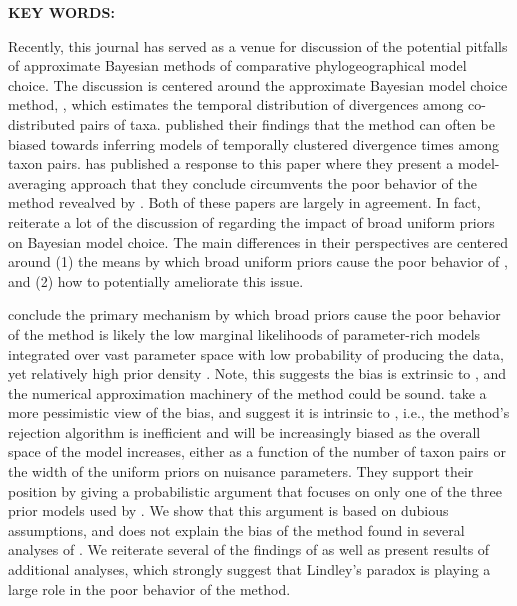 \documentclass[letterpaper,12pt]{article}
\begin{document}
\begin{linenumbers}
{    \vspace{12pt}
    \noindent\textbf{KEY WORDS: } 
}

\newpage
\noindent Recently, this journal has served as a venue for discussion of the
potential pitfalls of approximate Bayesian methods of comparative
phylogeographical model choice.
The discussion is centered around the approximate Bayesian model choice method,
\msb, which estimates the temporal distribution of divergences among
co-distributed pairs of taxa.
\citet{Oaks2012} published their findings that the method \msb can often be
biased towards inferring models of temporally clustered divergence times
among taxon pairs.
\citet{Hickerson2013} has published a response to this paper where they
present a model-averaging approach that they conclude circumvents the poor
behavior of the method revealved by \citet{Oaks2012}.
Both of these papers are largely in agreement.
In fact, \citet{Hickerson2013} reiterate a lot of the discussion of
\citet{Oaks2012} regarding the impact of broad uniform priors on Bayesian model
choice.
The main differences in their perspectives are centered around
(1) the means by which broad uniform priors cause the poor behavior of \msb,
and
(2) how to potentially ameliorate this issue.

\citet{Oaks2012} conclude the primary mechanism by which broad priors cause the
poor behavior of the method is likely the low marginal likelihoods of
parameter-rich models integrated over vast parameter space with low probability
of producing the data, yet relatively high prior density \citep[this is often
referred to as Lindley's paradox;][]{Lindley1957}.
Note, this suggests the bias is extrinsic to \msb, and the numerical
approximation machinery of the method could be sound.
\citet{Hickerson2013} take a more pessimistic view of the bias, and suggest it
is intrinsic to \msb, i.e., the method's rejection algorithm is
inefficient and will be increasingly biased as the overall space of the model
increases, either as a function of the number of taxon pairs or the width of
the uniform priors on nuisance parameters.
They support their position by giving a probabilistic argument that focuses on
only one of the three prior models used by \citet{Oaks2012}.
We show that this argument is based on dubious assumptions, and does not
explain the bias of the method found in several analyses of \citet{Oaks2012}.
We reiterate several of the findings of \citet{Oaks2012} as well as present
results of additional analyses, which strongly suggest that Lindley's paradox
is playing a large role in the poor behavior of the method.


\end{linenumbers}
\end{document}
